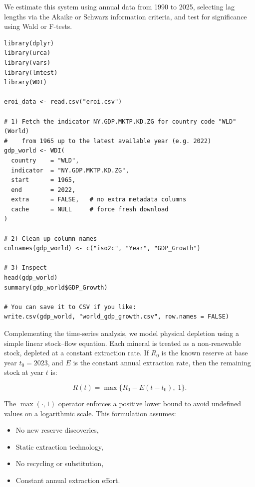\documentclass[a4paper,12pt]{article}
\begin{document}
We estimate this system using annual data from 1990 to 2025, selecting lag lengths via the Akaike or Schwarz information criteria, and test for significance using Wald or F-tests.

\begin{lstlisting}[caption={Fetching and Cleaning World GDP Growth Data from the World Bank}, label={lst:gdp_fetch}]
library(dplyr)
library(urca)
library(vars)
library(lmtest)
library(WDI)

eroi_data <- read.csv("eroi.csv")

# 1) Fetch the indicator NY.GDP.MKTP.KD.ZG for country code "WLD" (World)
#    from 1965 up to the latest available year (e.g. 2022)
gdp_world <- WDI(
  country    = "WLD",
  indicator  = "NY.GDP.MKTP.KD.ZG",
  start      = 1965,
  end        = 2022,
  extra      = FALSE,   # no extra metadata columns
  cache      = NULL     # force fresh download
)

# 2) Clean up column names
colnames(gdp_world) <- c("iso2c", "Year", "GDP_Growth")

# 3) Inspect
head(gdp_world)
summary(gdp_world$GDP_Growth)

# You can save it to CSV if you like:
write.csv(gdp_world, "world_gdp_growth.csv", row.names = FALSE)
\end{lstlisting}


Complementing the time-series analysis, we model physical depletion using a simple linear stock–flow equation. Each mineral is treated as a non-renewable stock, depleted at a constant extraction rate. If \( R_0 \) is the known reserve at base year \( t_0 = 2023 \), and \( E \) is the constant annual extraction rate, then the remaining stock at year \( t \) is:

\[
R(t) = \max\bigl\{ R_0 - E(t - t_0), \;1 \bigr\}.
\]

The \( \max(\cdot, 1) \) operator enforces a positive lower bound to avoid undefined values on a logarithmic scale. This formulation assumes:
\begin{itemize}
    \item No new reserve discoveries,
    \item Static extraction technology,
    \item No recycling or substitution,
    \item Constant annual extraction effort.
\end{itemize}
\end{document}
